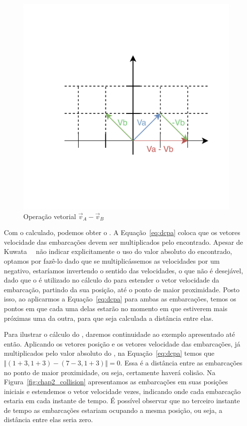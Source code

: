         \begin{figure}
            \centering
            \includegraphics[scale=1.5]{fig/chap2/cpa_explanation_va_vb.pdf}
            \caption{Operação vetorial  $\vec{v}_{A}-\vec{v}_{B}$}
            \label{fig:chap2_va_vb}
        \end{figure}
        
        Com o \tcpa calculado, podemos obter o \dcpa. A Equação~\ref{eq:dcpa} coloca que os vetores velocidade das embarcações devem ser multiplicados pelo \tcpa encontrado. Apesar de Kuwata~\etal~\cite{Kuwata2014Safe} não indicar explicitamente o uso do valor absoluto do \tcpa encontrado, optamos por fazê-lo dado que se multiplicássemos as velocidades por um \tcpa negativo, estaríamos invertendo o sentido das velocidades, o que não é desejável, dado que o \tcpa é utilizado no cálculo do \dcpa para estender o vetor velocidade da embarcação, partindo da sua posição, até o ponto de maior proximidade. Posto isso, ao aplicarmos a Equação~\ref{eq:dcpa} para ambas as embarcações, temos os pontos em que cada uma delas estarão no momento em que estiverem mais próximas uma da outra, para que seja calculada a distância entre elas. 
      
        Para ilustrar o cálculo do \dcpa, daremos continuidade ao exemplo apresentado até então. Aplicando os vetores posição e os vetores velocidade das embarcações, já multiplicados pelo valor absoluto do \tcpa, na Equação~\ref{eq:dcpa} temos que $\Vert (1+3,1+3)-(7-3,1+3)\Vert = 0$. Essa é a distância entre as embarcações no ponto de maior proximidade, ou seja, certamente haverá colisão. Na Figura~\ref{fig:chap2_collision} apresentamos as embarcações em suas posições iniciais e estendemos o vetor velocidade \tcpa vezes, indicando onde cada embarcação estaria em cada instante de tempo. É possível observar que no terceiro instante de tempo as embarcações estariam ocupando a mesma posição, ou seja, a distância entre elas seria zero.
        
